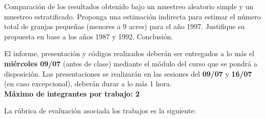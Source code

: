 \begin{questions}
\question Comparación de los resultados obtenido bajo un muestreo aleatorio simple y un muestreo estratificado.
\question Proponga una estimación indirecta para estimar el número total de granjas pequeñas (menores a 9 acres) para el año 1997. Justifique su propuesta en base a los años 1987 y 1992.
\question Conclusión.
\end{questions}

El informe, presentación y códigos realizados deberán ser entregados a lo más el \textbf{miércoles 09/07} (antes de clase) mediante el módulo del curso que se pondrá a disposición. Las presentaciones se realizarán en las sesiones del \textbf{09/07} y \textbf{16/07} (en caso excepcional), deberán durar a lo más 1 hora.\\

\textbf{Máximo de integrantes por trabajo: 2}

La rúbrica de evaluación asociada los trabajos es la siguiente:

